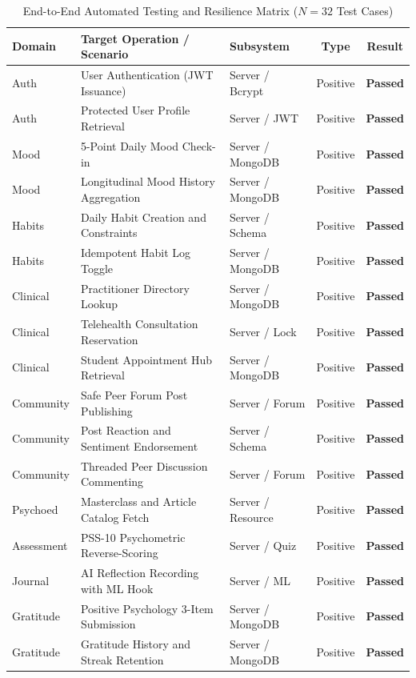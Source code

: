 \begin{table}[H]
\centering
\small
\caption{End-to-End Automated Testing and Resilience Matrix ($N=32$ Test Cases)}
\label{tab:testing_matrix}
\begin{tabular}{lp{6.2cm}lcc}
\toprule
\textbf{Domain} & \textbf{Target Operation / Scenario} & \textbf{Subsystem} & \textbf{Type} & \textbf{Result} \\
\midrule
Auth & User Authentication (JWT Issuance) & Server / Bcrypt & Positive & \textbf{Passed} \\
Auth & Protected User Profile Retrieval & Server / JWT & Positive & \textbf{Passed} \\
Mood & 5-Point Daily Mood Check-in & Server / MongoDB & Positive & \textbf{Passed} \\
Mood & Longitudinal Mood History Aggregation & Server / MongoDB & Positive & \textbf{Passed} \\
Habits & Daily Habit Creation and Constraints & Server / Schema & Positive & \textbf{Passed} \\
Habits & Idempotent Habit Log Toggle & Server / MongoDB & Positive & \textbf{Passed} \\
Clinical & Practitioner Directory Lookup & Server / MongoDB & Positive & \textbf{Passed} \\
Clinical & Telehealth Consultation Reservation & Server / Lock & Positive & \textbf{Passed} \\
Clinical & Student Appointment Hub Retrieval & Server / MongoDB & Positive & \textbf{Passed} \\
Community & Safe Peer Forum Post Publishing & Server / Forum & Positive & \textbf{Passed} \\
Community & Post Reaction and Sentiment Endorsement & Server / Schema & Positive & \textbf{Passed} \\
Community & Threaded Peer Discussion Commenting & Server / Forum & Positive & \textbf{Passed} \\
Psychoed & Masterclass and Article Catalog Fetch & Server / Resource & Positive & \textbf{Passed} \\
Assessment & PSS-10 Psychometric Reverse-Scoring & Server / Quiz & Positive & \textbf{Passed} \\
Journal & AI Reflection Recording with ML Hook & Server / ML & Positive & \textbf{Passed} \\
Gratitude & Positive Psychology 3-Item Submission & Server / MongoDB & Positive & \textbf{Passed} \\
Gratitude & Gratitude History and Streak Retention & Server / MongoDB & Positive & \textbf{Passed} \\

\end{tabular}
\end{table}
